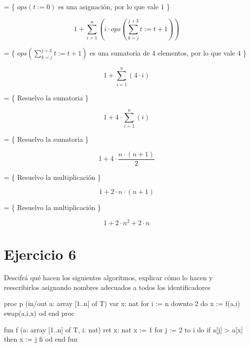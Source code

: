 \documentclass{article}
\begin{document}
= \{ $ops(t := 0)$ es una asignación, por lo que vale $1$ \}

\begin{equation*}
  1 + \sum_{i=1}^{n} \left(  i \cdot ops \left(\sum_{k=j}^{j+3} t := t+1 \right) \right)
\end{equation*}

= \{ $ops \left(\sum_{k=j}^{j+3} t := t+1 \right)$ es una sumatoria de $4$ elementos, por lo que vale $4$ \}

\begin{equation*}
  1 + \sum_{i=1}^{n} \left(  4 \cdot i \right)
\end{equation*}

= \{ Resuelvo la sumatoria \}

\begin{equation*}
  1 + 4 \cdot \sum_{i=1}^{n} \left(  i \right)
\end{equation*}

= \{ Resuelvo la sumatoria \}

\begin{equation*}
  1 + 4 \cdot \frac{n \cdot (n+1)}{2}
\end{equation*}

= \{ Resuelvo la multiplicación \}

\begin{equation*}
  1 + 2 \cdot n \cdot (n+1)
\end{equation*}

= \{ Resuelvo la multiplicación \}

\begin{equation*}
  1 + 2 \cdot n^2 + 2 \cdot n
\end{equation*}

\newpage

\section*{Ejercicio 6}
Descifrá qué hacen los siguientes algoritmos, explicar cómo lo hacen y reescribirlos asignando nombres adecuados a todos los identificadores
\begin{pascallike}
proc p (in/out a: array [1..n] of T)
  var x: nat
  for i := n downto 2 do
    x := f(a,i)
    swap(a,i,x)
  od
end proc
\end{pascallike}

\begin{pascallike}
fun f (a: array [1..n] of T, i: nat) ret x: nat
  x := 1
  for j := 2 to i do
    if a[j] > a[x] then
      x := j
    fi
  od
end fun
\end{pascallike}
\end{document}
